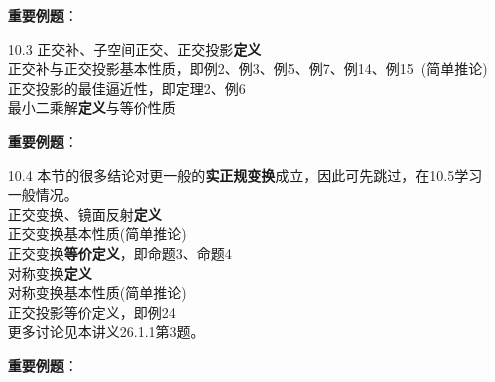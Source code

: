 \documentclass[a4paper,UTF8,fontset=windows,AutoFakeBold]{ctexart}
\newcommand*{\note}{\noindent *}
\begin{document}
\begin{enumerate}
    \textbf{重要例题}：

    \item[10.3] 正交补、子空间正交、正交投影\textbf{定义}
    \\正交补与正交投影基本性质，即例2、例3、例5、例7、例14、例15\ (简单推论)
    \\正交投影的最佳逼近性，即定理2、例6
    \\最小二乘解\textbf{定义}与等价性质

    \textbf{重要例题}：

    \item[10.4] \note 本节的很多结论对更一般的\textbf{实正规变换}成立，因此可先跳过，在10.5学习一般情况。
    \\正交变换、镜面反射\textbf{定义}
    \\正交变换基本性质(简单推论)
    \\正交变换\textbf{等价定义}，即命题3、命题4
    \\对称变换\textbf{定义}
    \\对称变换基本性质(简单推论)
    \\正交投影等价定义，即例24
    \\\note 更多讨论见本讲义26.1.1第3题。

    \textbf{重要例题}：


\end{enumerate}
\end{document}
